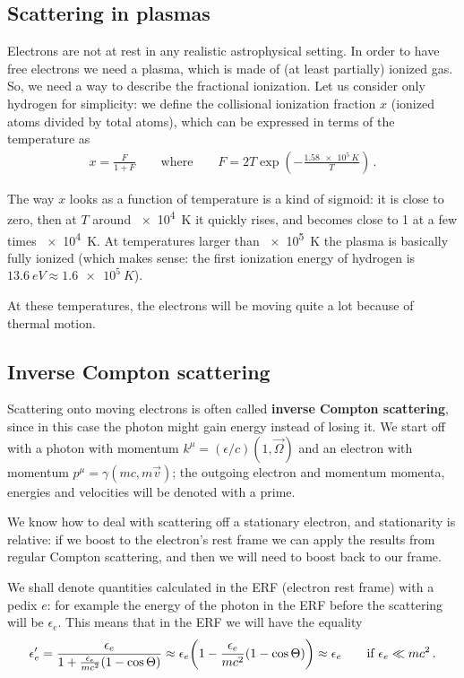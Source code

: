 \documentclass[main.tex]{subfiles}
\begin{document}
\subsection{Scattering in plasmas}

Electrons are not at rest in any realistic astrophysical setting. In order to have free electrons we need a plasma, which is made of (at least partially) ionized gas. 
So, we need a way to describe the fractional ionization.
Let us consider only hydrogen for simplicity: we define the collisional ionization fraction \(x\) (ionized atoms divided by total atoms), which can be expressed in terms of the temperature as 
%
\begin{align}
x = \frac{F}{1 + F} 
\qquad \text{where} \qquad
F = 2T \exp(-\frac{\SI{1.58e5}{K}}{T})
\,.
\end{align}

The way \(x\) looks as a function of temperature is a kind of sigmoid: it is close to zero, then at \(T\) around \SI{e4}{K} it quickly rises, and becomes close to 1 at a few times \SI{e4}{K}. At temperatures larger than \SI{e5}{K} the plasma is basically fully ionized (which makes sense: the first ionization energy of hydrogen is \(\SI{13.6}{eV} \approx \SI{1.6e5}{K}\)). 

At these temperatures, the electrons will be moving quite a lot because of thermal motion. 

\subsection{Inverse Compton scattering}

Scattering onto moving electrons is often called \textbf{inverse Compton scattering}, since in this case the photon might gain energy instead of losing it. 
We start off with a photon with momentum \(k^{\mu } = (\epsilon /c) (1, \vec{\Omega})\) and an electron with momentum \(p^{\mu } = \gamma (mc, m \vec{v})\); the outgoing electron and momentum momenta, energies and velocities will be denoted with a prime. 

We know how to deal with scattering off a stationary electron, and stationarity is relative: if we boost to the electron's rest frame we can apply the results from regular Compton scattering, and then we will need to boost back to our frame. 

We shall denote quantities calculated in the ERF (electron rest frame) with a pedix \(e\): for example the energy of the photon in the ERF before the scattering will be \(\epsilon_e\).
This means that in the ERF we will have the equality 
%
\begin{align}
\epsilon_e' 
= \frac{\epsilon_e}{1 + \frac{\epsilon_e}{mc^2} (1 - \cos \Theta )} 
\approx \epsilon_e \qty(1 - \frac{\epsilon_e}{mc^2} (1 - \cos \Theta )) 
\approx \epsilon_e 
\qquad \text{if } \epsilon_e \ll m c^2 
\,.
\end{align}
\end{document}
